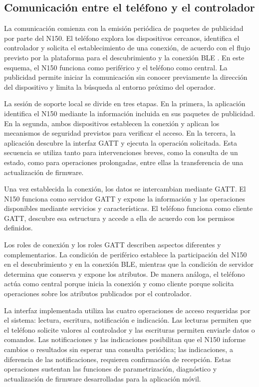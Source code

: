 \subsection{Comunicación entre el teléfono y el controlador}
\label{subsec:comunicacion_ble}

La comunicación comienza con la emisión periódica de paquetes de publicidad por parte del N150. El teléfono explora los dispositivos cercanos, identifica el controlador y solicita el establecimiento de una conexión, de acuerdo con el flujo previsto por la plataforma para el descubrimiento y la conexión BLE \cite{espressif:esp-idf-ble}. En este esquema, el N150 funciona como periférico y el teléfono como central. La publicidad permite iniciar la comunicación sin conocer previamente la dirección del dispositivo y limita la búsqueda al entorno próximo del operador.

La sesión de soporte local se divide en tres etapas. En la primera, la aplicación identifica el N150 mediante la información incluida en sus paquetes de publicidad. En la segunda, ambos dispositivos establecen la conexión y aplican los mecanismos de seguridad previstos para verificar el acceso. En la tercera, la aplicación descubre la interfaz GATT y ejecuta la operación solicitada. Esta secuencia se utiliza tanto para intervenciones breves, como la consulta de un estado, como para operaciones prolongadas, entre ellas la transferencia de una actualización de firmware.

Una vez establecida la conexión, los datos se intercambian mediante GATT. El N150 funciona como servidor GATT y expone la información y las operaciones disponibles mediante servicios y características. El teléfono funciona como cliente GATT, descubre esa estructura y accede a ella de acuerdo con los permisos definidos.

Los roles de conexión y los roles GATT describen aspectos diferentes y complementarios. La condición de periférico establece la participación del N150 en el descubrimiento y en la conexión BLE, mientras que la condición de servidor determina que conserva y expone los atributos. De manera análoga, el teléfono actúa como central porque inicia la conexión y como cliente porque solicita operaciones sobre los atributos publicados por el controlador.

La interfaz implementada utiliza las cuatro operaciones de acceso requeridas por el sistema: lectura, escritura, notificación e indicación. Las lecturas permiten que el teléfono solicite valores al controlador y las escrituras permiten enviarle datos o comandos. Las notificaciones y las indicaciones posibilitan que el N150 informe cambios o resultados sin esperar una consulta periódica; las indicaciones, a diferencia de las notificaciones, requieren confirmación de recepción. Estas operaciones sustentan las funciones de parametrización, diagnóstico y actualización de firmware desarrolladas para la aplicación móvil.
